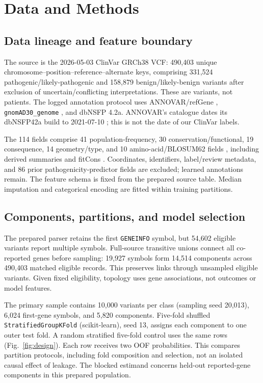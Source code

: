 \section{Data and Methods}

\subsection{Data lineage and feature boundary}
The source is the 2026-05-03 ClinVar GRCh38 VCF: 490,403 unique chromosome--position--reference--alternate keys, comprising 331,524 pathogenic/likely-pathogenic and 158,879 benign/likely-benign variants after exclusion of uncertain/conflicting interpretations. These are variants, not patients. The logged annotation protocol uses ANNOVAR/refGene \cite{wang2010annovar}, \texttt{gnomAD30\_genome} \cite{karczewski2020gnomad}, and dbNSFP 4.2a. ANNOVAR's catalogue dates its dbNSFP42a build to 2021-07-10 \cite{annovar2026catalogue}; this is not the date of our ClinVar labels.

The 114 fields comprise 41 population-frequency, 30 conservation/functional, 19 consequence, 14 geometry/type, and 10 amino-acid/BLOSUM62 fields \cite{henikoff1992blosum}, including derived summaries and fitCons \cite{gulko2015fitcons}. Coordinates, identifiers, label/review metadata, and 86 prior pathogenicity-predictor fields are excluded; learned annotations remain. The feature schema is fixed from the prepared source table. Median imputation and categorical encoding are fitted within training partitions.

\subsection{Components, partitions, and model selection}
The prepared parser retains the first \texttt{GENEINFO} symbol, but 54,602 eligible variants report multiple symbols. Full-source transitive unions connect all co-reported genes before sampling: 19,927 symbols form 14,514 components across 490,403 matched eligible records. This preserves links through unsampled eligible variants. Given fixed eligibility, topology uses gene associations, not outcomes or model features.

The primary sample contains 10,000 variants per class (sampling seed 20,013), 6,024 first-gene symbols, and 5,820 components. Five-fold shuffled \texttt{StratifiedGroupKFold} (scikit-learn), seed 13, assigns each component to one outer test fold. A random stratified five-fold control uses the same rows (Fig.~\ref{fig:design}). Each row receives two OOF probabilities. This compares partition protocols, including fold composition and selection, not an isolated causal effect of leakage. The blocked estimand concerns held-out reported-gene components in this prepared population.

